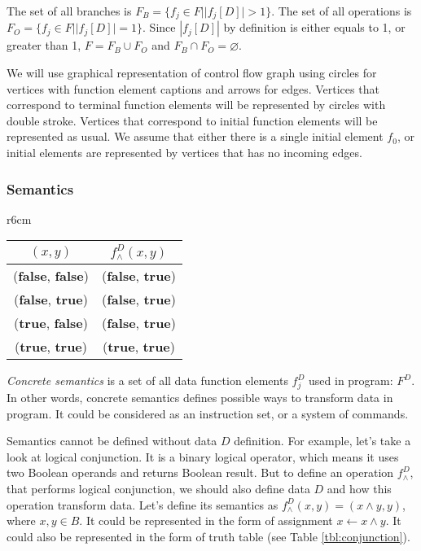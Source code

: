 \documentclass[fleqn,oneside,a4]{article}
\newcommand{\subsublevel}{\subsubsection}
\newcommand{\la}{\leftarrow}
\newcommand{\altterm}[2]{\textit{#1}\index{#2}}
\newcommand{\true}{\textbf{true}}
\newcommand{\false}{\textbf{false}}
\begin{document}
The set of all branches is $F_B = \{f_j \in F | |f_j[D]| > 1\}$.
The set of all operations is $F_O = \{f_j \in F | |f_j[D]| = 1\}$.
Since $|f_j[D]|$ by definition is either equals to 1, or greater than 1,
$F = F_B \cup F_O$ and $F_B \cap F_O = \varnothing$.

We will use graphical representation of control flow graph using circles
for vertices with function element captions and arrows for edges.
Vertices that correspond to terminal function elements will be represented
by circles with double stroke.
Vertices that correspond to initial function elements will be represented
as usual.
We assume that either there is a single initial element $f_0$,
or initial elements are represented by vertices that has no incoming edges.

\subsublevel*{Semantics}

\begin{wraptable}{r}{6cm}
    \begin{center}
        \begin{tabular}{| c | c |}
            \hline
            $(x, y)$         & $f^D_\land(x, y)$ \\ \hline \hline
            (\false, \false) & (\false, \true)   \\ \hline
            (\false, \true)  & (\false, \true)   \\ \hline
            (\true, \false)  & (\false, \true)   \\ \hline
            (\true, \true)   & (\true, \true)    \\ \hline
        \end{tabular}
        \label{tbl:conjunction}
    \end{center}
    \caption{Conjunction truth table.}
\end{wraptable}

\altterm{Concrete semantics}{concrete semantics} is a set of all data function
elements $f^D_j$ used in program: $F^D$.
In other words, concrete semantics defines
possible ways to transform data in program.
It could be considered as an instruction set, or a system of commands.

Semantics cannot be defined without data $D$ definition.
For example, let's take a look at logical conjunction.
It is a binary logical operator, which means it uses two Boolean operands
and returns Boolean result.
But to define an operation $f^D_\land$, that performs logical conjunction,
we should also define data $D$ and how this operation transform data.
Let's define its semantics as $f^D_\land(x, y) = (x \land y, y)$,
where $x, y \in B$.
It could be represented in the form of assignment $x \la x \land y$.
It could also be represented in the form of truth table
(see Table \ref{tbl:conjunction}).
\end{document}

